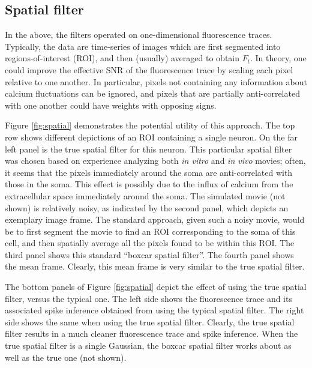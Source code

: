 \subsection{Spatial filter} \label{sec:results:spatial}

In the above, the filters operated on one-dimensional fluorescence traces. Typically, the data are time-series of images which are first segmented into regions-of-interest (ROI), and then (usually) averaged to obtain $F_t$.  In theory, one could improve the effective SNR of the fluorescence trace by scaling each pixel relative to one another.  In particular, pixels not containing any information about calcium fluctuations can be ignored, and pixels that are partially anti-correlated with one another could have weights with opposing signs.  

Figure \ref{fig:spatial} demonstrates the potential utility of this approach.  The top row shows different depictions of an ROI containing a single neuron.  On the far left panel is the true spatial filter for this neuron.  This particular spatial filter was chosen based on experience analyzing both \emph{in vitro} and \emph{in vivo} movies; often, it seems that the pixels immediately around the soma are anti-correlated with those in the soma.  This effect is possibly due to the influx of calcium from the extracellular space immediately around the soma.  The simulated movie (not shown) is relatively noisy, as indicated by the second panel, which depicts an exemplary image frame.  The standard approach, given such a noisy movie, would be to first segment the movie to find an ROI corresponding to the soma of this cell, and then spatially average all the pixels found to be within this ROI.  The third panel shows this standard ``boxcar spatial filter''.  The fourth panel shows the mean frame.  Clearly, this mean frame is very similar to the true spatial filter.  

The bottom panels of Figure \ref{fig:spatial} depict the effect of using the true spatial filter, versus the typical one. The left side shows the fluorescence trace and its associated spike inference obtained from using the typical spatial filter.  The right side shows the same when using the true spatial filter.  Clearly, the true spatial filter results in a much cleaner fluorescence trace and spike inference.  When the true spatial filter is a single Gaussian, the boxcar spatial filter works about as well as the true one (not shown).


